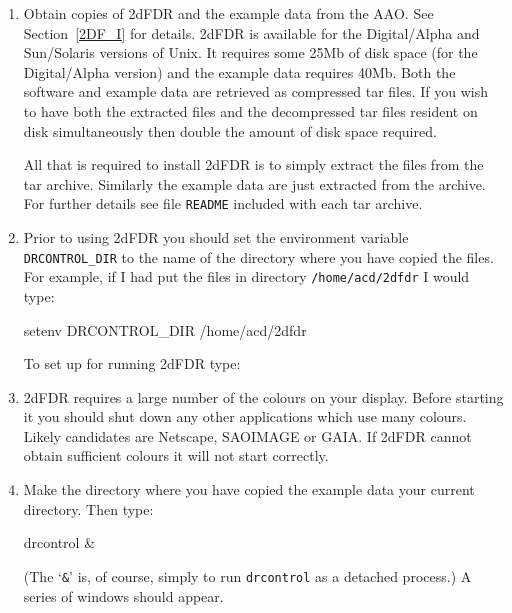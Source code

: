 \documentclass[chapters,twoside,11pt]{starlink}
\begin{document}
\begin{enumerate}

  \item Obtain copies of 2dFDR and the example data from the AAO.
   See Section~\ref{2DF_I} for details.  2dFDR is available for the
   Digital/Alpha and Sun/Solaris versions of Unix.  It requires some 25Mb
   of disk space (for the Digital/Alpha version) and the example data
   requires 40Mb.  Both the software and example data are retrieved as
   compressed tar files.  If you wish to have both the extracted files
   and the decompressed tar files resident on disk simultaneously then
   double the amount of disk space required.

   All that is required to install 2dFDR is to simply extract the
   files from the tar archive.  Similarly the example data are just
   extracted from the archive.  For further details see file \texttt{README} included with each tar archive.

  \item Prior to using 2dFDR you should set the environment variable
   \texttt{DRCONTROL\_DIR} to the name of the directory where you have
   copied the files.  For example, if I had put the files in directory
   \texttt{/home/acd/2dfdr} I would type:

\begin{terminalv}
setenv  DRCONTROL_DIR  /home/acd/2dfdr
\end{terminalv}

   To set up for running 2dFDR type:


  \item 2dFDR requires a large number of the colours on your display.
   Before starting it you should shut down any other applications which
   use many colours.  Likely candidates are Netscape, SAOIMAGE or
   GAIA.  If 2dFDR cannot obtain sufficient colours it will not start
   correctly.

  \item Make the directory where you have copied the example data
   your current directory.  Then type:

\begin{terminalv}
drcontrol &
\end{terminalv}

   (The `\texttt{\&}' is, of course, simply to run \texttt{drcontrol} as a
   detached process.)  A series of windows should appear.


\end{enumerate}
\end{document}
